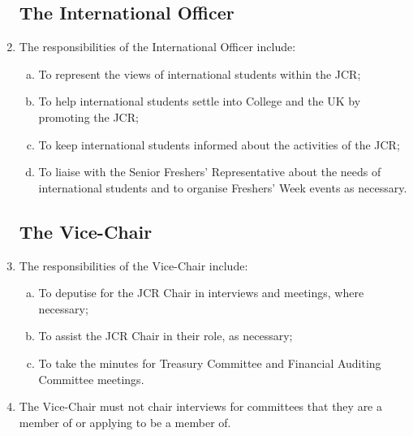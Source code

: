\documentclass[12pt]{article}  %
\begin{document}
\begin{enumerate}
	\subsection{The International Officer}
	\item The responsibilities of the International Officer include:
	\begin{enumerate}[(a)]
		\item To represent the views of international students within the JCR;
		\item To help international students settle into College and the UK by promoting the JCR;
		\item To keep international students informed about the activities of the JCR;
		\item To liaise with the Senior Freshers’ Representative about the needs of international students and to organise Freshers’ Week events as necessary.
	\end{enumerate}
	\subsection{The Vice-Chair}
	\item The responsibilities of the Vice-Chair include:
	\begin{enumerate}[(a)]
		\item To deputise for the JCR Chair in interviews and meetings, where necessary;
		\item To assist the JCR Chair in their role, as necessary;
		\item To take the minutes for Treasury Committee and Financial Auditing Committee meetings.
	\end{enumerate}
	\item The Vice-Chair must not chair interviews for committees that they are a member of or applying to be a member of.
\end{enumerate}
\newpage
\end{document}
